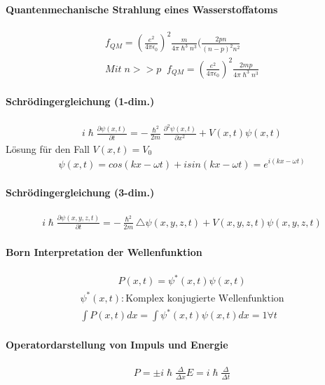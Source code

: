 \documentclass[10pt,a4paper]{article}
\begin{document}
\paragraph{Quantenmechanische Strahlung eines Wasserstoffatoms}
\begin{align}
f_{QM}= (\frac{e^2}{4\pi\epsilon_0})^2\frac{m}{4\pi\hslash^3 n^3}(\frac{2pn}{(n-p)^2n^2}\\
Mit\; n>>p\;\; f_{QM}= (\frac{e^2}{4\pi\epsilon_0})^2\frac{2mp}{4\pi\hslash^3 n^3}
\end{align}
\paragraph{Schrödingergleichung (1-dim.)}
\begin{align}
i\hslash\frac{\partial\psi(x,t)}{\partial t}= -\frac{\hslash^2}{2m}\frac{\partial^2\psi(x,t)}{\partial x^2} + V(x,t)\psi(x,t)
\end{align}
Lösung für den Fall $V(x,t)=V_0$
\begin{align}
\psi(x,t)=cos(kx-\omega t)+ isin(kx-\omega t) = e^{i(kx-\omega t)}
\end{align}
\paragraph{Schrödingergleichung (3-dim.)}
\begin{align}
i\hslash\frac{\partial\psi(x,y,z,t)}{\partial t}= -\frac{\hslash^2}{2m} \triangle\psi(x,y,z,t)+V(x,y,z,t)\psi(x,y,z,t)
\end{align}
\paragraph{Born Interpretation der Wellenfunktion}
\begin{align}
P(x,t)=\psi^*(x,t)\psi(x,t)
\end{align}
\begin{align}
\psi^*(x,t): \text{Komplex konjugierte Wellenfunktion} \\
\int P(x,t)dx = \int \psi^*(x,t)\psi(x,t) dx = 1 \forall t
\end{align}
\paragraph{Operatordarstellung von Impuls und Energie}
\begin{align}
P=\pm i\hslash \frac{\Delta}{\Delta x}
E = i\hslash \frac{\Delta}{\Delta t}
\end{align}
\end{document}
